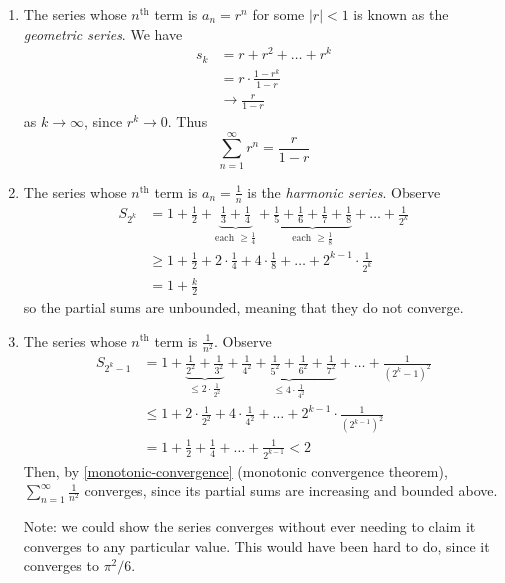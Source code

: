 \documentclass{../../template/note}
\begin{document}
    \begin{example}
        \begin{enumerate}[label=\protect\circled{\arabic*}]
            \item The series whose \(n^\text{th}\) term is \(a_n = r^n\) for some \(|r| < 1\) is known as the \emph{geometric series}. We have
            \begin{align*}
                s_k &= r + r^2 + \dots + r^k \\
                &= r \cdot \frac{1-r^k}{1-r} \\
                &\to \frac{r}{1-r}
            \end{align*}
            as \(k \to \infty\), since \(r^k \to 0\). Thus
            \[
                \sum_{n=1}^\infty r^n = \frac{r}{1-r}
            \]
            \item The series whose \(n^\text{th}\) term is \(a_n = \frac{1}{n}\) is the \emph{harmonic series}. Observe
            \begin{align*}
                S_{2^k} &= 1 + \frac{1}{2} + \underbrace{\frac 1 3 + \frac 1 4}_{\text{each }\geq \frac 1 4} + \underbrace{\frac 1 5 + \frac 1 6 + \frac 1 7 + \frac 1 8}_{\text{each } \geq \frac 1 8} + \dots + \frac{1}{2^k} \\
                &\geq 1 + \frac{1}{2} + 2 \cdot \frac{1}{4} + 4 \cdot \frac 1 8 + \dots + 2^{k-1} \cdot \frac{1}{2^k} \\
                &= 1 + \frac{k}{2}
            \end{align*}
            so the partial sums are unbounded, meaning that they do not converge.
            \item The series whose \(n^\text{th}\) term is \(\frac{1}{n^2}\). Observe
            \begin{align*}
                S_{2^k-1} &= 1 + \underbrace{\frac{1}{2^2} + \frac{1}{3^2}}_{\leq 2 \cdot \frac{1}{2^2}} + \underbrace{\frac{1}{4^2} + \frac{1}{5^2} + \frac{1}{6^2} + \frac{1}{7^2}}_{\leq 4 \cdot \frac{1}{4^2}} + \dots + \frac{1}{(2^k-1)^2} \\
                &\leq 1 + 2 \cdot \frac{1}{2^2} + 4 \cdot \frac{1}{4^2} + \dots + 2^{k-1} \cdot \frac{1}{(2^{k-1})^2} \\
                &= 1 + \frac 1 2 + \frac 1 4 + \dots + \frac{1}{2^{k-1}} < 2
            \end{align*}
            Then, by \cref{monotonic-convergence} (monotonic convergence theorem), \(\sum_{n=1}^\infty \frac 1 {n^2}\) converges, since its partial sums are increasing and bounded above.

            Note: we could show the series converges without ever needing to claim it converges to any particular value. This would have been hard to do, since it converges to \(\pi^2/6\).
        \end{enumerate}        
    \end{example}
    
\end{document}
